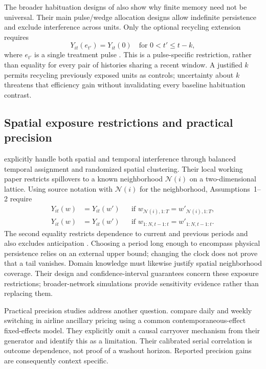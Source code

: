 The broader habituation designs of \citet{basse2023} also show why finite memory need not be universal. Their main pulse/wedge allocation designs allow indefinite persistence and exclude interference across units. Only the optional recycling extension requires
\[
 Y_{it}(e_{t'})=Y_{it}(0)\quad\text{for }0<t'\leq t-k,
\]
where $e_{t'}$ is a single treatment pulse \citep[Assumption~3, p.~15]{basse2023}. This is a pulse-specific restriction, rather than equality for every pair of histories sharing a recent window. A justified $k$ permits recycling previously exposed units as controls; uncertainty about $k$ threatens that efficiency gain without invalidating every baseline habituation contrast.

\subsection{Spatial exposure restrictions and practical precision}

\citet{nipanel2024} explicitly handle both spatial and temporal interference through balanced temporal assignment and randomized spatial clustering. Their local working paper restricts spillovers to a known neighborhood $\mathcal N(i)$ on a two-dimensional lattice. Using source notation with $\mathcal N(i)$ for the neighborhood, Assumptions~1--2 require
\begin{align*}
 Y_{it}(w)&=Y_{it}(w')
 &&\text{if }w_{\mathcal N(i),1:T}=w'_{\mathcal N(i),1:T},\\
 Y_{it}(w)&=Y_{it}(w')
 &&\text{if }w_{1:N,t-1:t}=w'_{1:N,t-1:t}.
\end{align*}
The second equality restricts dependence to current and previous periods and also excludes anticipation \citep[p.~8]{nipanel2024}. Choosing a period long enough to encompass physical persistence relies on an external upper bound; changing the clock does not prove that a tail vanishes. Domain knowledge must likewise justify spatial neighborhood coverage. Their design and confidence-interval guarantees concern these exposure restrictions; broader-network simulations provide sensitivity evidence rather than replacing them.

Practical precision studies address another question. \citet{ferrari2026} compare daily and weekly switching in airline ancillary pricing using a common contemporaneous-effect fixed-effects model. They explicitly omit a causal carryover mechanism from their generator and identify this as a limitation. Their calibrated serial correlation is outcome dependence, not proof of a washout horizon. Reported precision gains are consequently context specific.


